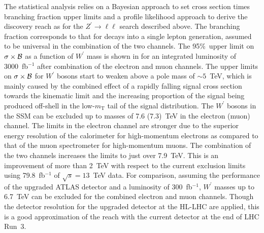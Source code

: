 The statistical analysis relies on a Bayesian approach to set cross section times branching fraction
upper limits and a profile likelihood approach to derive the discovery reach as
for the $Z^\prime \to \ell\ell$ search described above. The branching fraction corresponds to that
for decays into a single lepton generation, assumed to be universal in the combination of the two channels.
The 95\%~\cl upper limit on $\sigma\times\cal{B}$ as a function of $W^\prime$ mass is shown
in  for an integrated luminosity of 3000~fb$^{-1}$ after
combination of the electron and muon channels.
The upper limits on $\sigma\times\cal{B}$ for $W^\prime$ bosons start to weaken above a pole mass
of $\sim 5$~TeV, which is mainly caused by the combined effect of a rapidly falling signal cross section
towards the kinematic limit and the increasing proportion of the signal being produced off-shell in
the low-$m_\mathrm{T}$ tail of the signal distribution.
The $W^\prime$ bosons in the SSM can be excluded up to masses of 7.6 (7.3)~TeV in the electron (muon) channel.
The limits in the electron channel are stronger due to the superior energy resolution of the calorimeter
for high-momentum electrons as compared to that of the muon spectrometer for high-momentum muons.
The combination of the two channels increases the limits to just over 7.9~TeV. This is an improvement
of more than 2~TeV with respect to the current exclusion limits using 79.8~fb$^{-1}$ of $\sqrt{s}=13$~TeV data.
For comparison, assuming the performance of the upgraded ATLAS detector and a luminosity of 300~fb$^{-1}$,
$W^\prime$ masses up to 6.7~TeV can be excluded for the combined electron and muon channels. Though the detector resolution for the upgraded detector at the HL-LHC are applied, this is a good approximation of the reach with the current detector at the end of LHC Run~3. 
%
